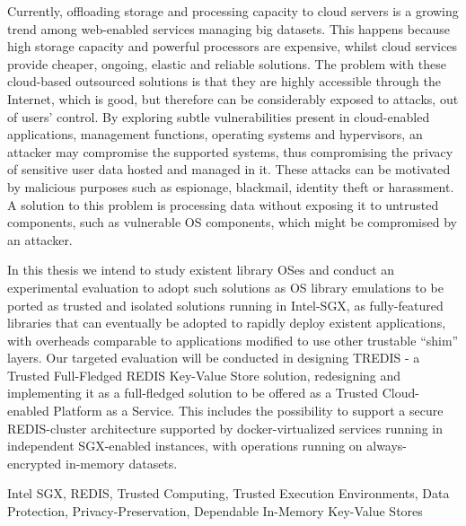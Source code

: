 
Currently, offloading storage and processing capacity to cloud servers is a growing trend among web-enabled services managing big datasets. This happens because high storage capacity and powerful processors are expensive, whilst cloud services provide cheaper, ongoing, elastic and reliable solutions. The problem with these cloud-based outsourced solutions is that they are highly accessible through the Internet, which is good, but therefore can be considerably exposed to attacks, out of users’ control. By exploring subtle vulnerabilities present in cloud-enabled applications, management functions, operating systems and hypervisors, an attacker may compromise the supported systems, thus compromising the privacy of sensitive user data hosted and managed in it. These attacks can be motivated by malicious purposes such as espionage, blackmail, identity theft or harassment. A solution to this problem is processing data without exposing it to untrusted components, such as vulnerable OS components, which might be compromised by an attacker.

In this thesis we intend to study existent library OSes and conduct an experimental evaluation to adopt such solutions as OS library emulations to be ported as trusted and isolated solutions running in Intel-SGX, as fully-featured libraries that can eventually be adopted to rapidly deploy existent applications, with overheads comparable to applications modified to use other trustable “shim” layers. Our targeted evaluation will be conducted in designing TREDIS - a Trusted Full-Fledged REDIS Key-Value Store solution, redesigning and implementing it as a full-fledged solution to be offered as a Trusted Cloud-enabled Platform as a Service. This includes the possibility to support a secure REDIS-cluster architecture supported by docker-virtualized services running in independent SGX-enabled instances, with operations running on always-encrypted in-memory datasets. 
\begin{keywords}
Intel SGX, REDIS, Trusted Computing, Trusted Execution Environments, Data Protection, Privacy-Preservation, Dependable In-Memory Key-Value Stores
\end{keywords} 



